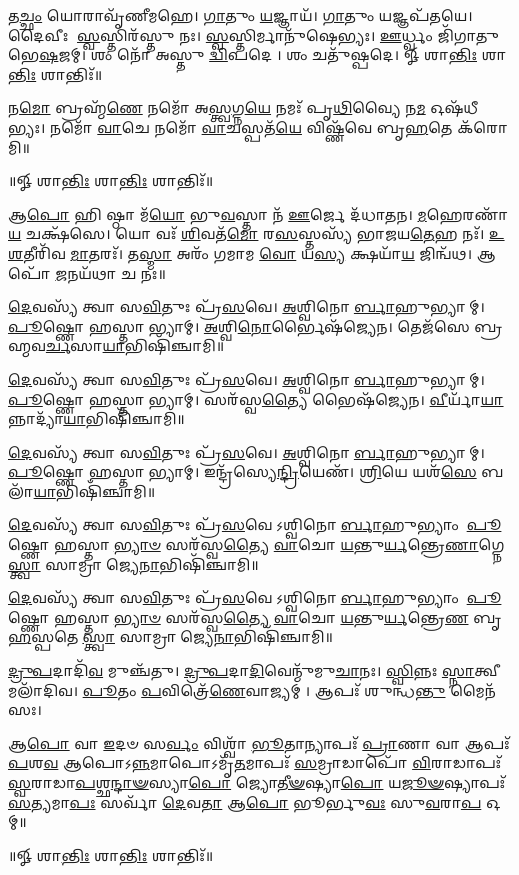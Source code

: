 𑌤\-\ul{𑌚𑍍𑌛𑌂} 𑌯𑍋𑌰𑌾𑌵𑍃᳴𑌣𑍀𑌮𑌹𑍇। \ul{𑌗𑌾}\-𑌤𑍁𑌂 \ul{𑌯}\-𑌜𑍍𑌞𑌾𑌯᳴।
\-\ul{𑌗𑌾}\-𑌤𑍁𑌂 𑌯𑌜𑍍𑌞𑌪᳴𑌤𑌯𑍇। 𑌦𑍈𑌵𑍀𑌃 \ul{𑌸𑍍𑌵}\-𑌸𑍍𑌤𑌿𑌰᳴𑌸𑍍𑌤𑍁 𑌨𑌃।
\-\ul{𑌸𑍍𑌵}\-𑌸𑍍𑌤𑌿𑌰𑍍𑌮𑌾𑌨𑍁᳴𑌷𑍇𑌭𑍍𑌯𑌃। \ul{𑌊}\-𑌰𑍍𑌧𑍍𑌵𑌂 𑌜𑌿᳴𑌗𑌾𑌤𑍁 𑌭𑍇\-\ul{𑌷}\-𑌜𑌮𑍍।
𑌶𑌂 𑌨𑍋᳴ 𑌅𑌸𑍍𑌤𑍁 \ul{𑌦𑍍𑌵𑌿}\-𑌪𑌦𑍇। 𑌶𑌂 𑌚𑌤𑍁᳴𑌷𑍍𑌪𑌦𑍇।
𑍐 𑌶𑌾\-\ul{𑌨𑍍𑌤𑌿𑌃} 𑌶𑌾\-\ul{𑌨𑍍𑌤𑌿𑌃} 𑌶𑌾𑌨𑍍𑌤𑌿𑌃᳴॥

𑌨\-\ul{𑌮𑍋} 𑌬𑍍𑌰𑌹𑍍𑌮᳴\-\ul{𑌣𑍇} 𑌨𑌮𑍋᳴ 𑌅\-\ul{𑌸𑍍𑌤𑍍𑌵}\-𑌗𑍍𑌨\-\ul{𑌯𑍇} 𑌨𑌮𑌃᳴ 𑌪𑍃\-\ul{𑌥𑌿}\-𑌵𑍍𑌯𑍈 𑌨\-\ul{𑌮} 𑌓𑌷᳴𑌧𑍀𑌭𑍍𑌯𑌃।
𑌨𑌮𑍋᳴ \ul{𑌵𑌾}\-𑌚𑍇 𑌨𑌮𑍋᳴ \ul{𑌵𑌾}\-𑌚𑌸𑍍𑌪𑌤᳴\-\ul{𑌯𑍇} 𑌵𑌿𑌷𑍍𑌣᳴𑌵𑍇 𑌬𑍃\-\ul{𑌹}\-𑌤𑍇 𑌕᳴𑌰𑍋𑌮𑌿॥

\centerline{॥𑍐 𑌶𑌾\-\ul{𑌨𑍍𑌤𑌿𑌃} 𑌶𑌾\-\ul{𑌨𑍍𑌤𑌿𑌃} 𑌶𑌾𑌨𑍍𑌤𑌿𑌃᳴॥}


𑌆\-\ul{𑌪𑍋} 𑌹𑌿 𑌷𑍍𑌠𑌾 𑌮᳴\-\ul{𑌯𑍋} 𑌭𑍁\-\ul{𑌵}\-𑌸𑍍𑌤𑌾 𑌨᳴ \ul{𑌊}\-𑌰𑍍𑌜𑍇 𑌦᳴𑌧𑌾𑌤𑌨।
\-\ul{𑌮}\-𑌹𑍇𑌰𑌣𑌾᳴\-\ul{𑌯} 𑌚𑌕𑍍𑌷᳴𑌸𑍇। 𑌯𑍋 𑌵𑌃᳴ \ul{𑌶𑌿}\-𑌵𑌤᳴\-\ul{𑌮𑍋} 𑌰\-\ul{𑌸}\-𑌸𑍍𑌤𑌸𑍍𑌯᳴ 𑌭𑌾𑌜𑌯\-\ul{𑌤𑍇}\-𑌹 𑌨𑌃᳴।
\-\ul{𑌉}\-\-\ul{𑌶}\-𑌤𑍀𑌰𑌿᳴𑌵 \ul{𑌮𑌾}\-𑌤𑌰𑌃᳴। 𑌤\-\ul{𑌸𑍍𑌮𑌾} 𑌅𑌰𑌂᳴ 𑌗𑌮𑌾𑌮 \ul{𑌵𑍋} 𑌯\-\ul{𑌸𑍍𑌯} 𑌕𑍍𑌷𑌯𑌾᳴\-\ul{𑌯} 𑌜𑌿𑌨𑍍𑌵᳴𑌥।
𑌆𑌪𑍋᳴ \ul{𑌜}\-𑌨𑌯᳴𑌥𑌾 𑌚 𑌨𑌃॥

\-\ul{𑌦𑍇}\-𑌵𑌸𑍍𑌯᳴ 𑌤𑍍𑌵𑌾 𑌸\-\ul{𑌵𑌿}\-𑌤𑍁𑌃 𑌪𑍍𑌰᳴\-\ul{𑌸}\-𑌵𑍇। \ul{𑌅}\-𑌶𑍍𑌵𑌿𑌨𑍋\-\ul{𑌰𑍍𑌬𑌾}\-𑌹𑍁𑌭𑍍𑌯𑌾𑌮𑍍। \ul{𑌪𑍂}\-𑌷𑍍𑌣𑍋 𑌹𑌸𑍍𑌤𑌾𑌭𑍍𑌯𑌾𑌮𑍍।
\-\ul{𑌅}\-𑌶𑍍𑌵𑌿\-\ul{𑌨𑍋}\-𑌰𑍍𑌭𑍈𑌷᳴𑌜𑍍𑌯𑍇𑌨। 𑌤𑍇𑌜᳴𑌸𑍇 𑌬𑍍𑌰𑌹𑍍𑌮𑌵\-\ul{𑌰𑍍𑌚}\-𑌸𑌾\-\ul{𑌯𑌾}\-𑌭𑌿𑌷𑌿᳴𑌞𑍍𑌚𑌾𑌮𑌿॥

\-\ul{𑌦𑍇}\-𑌵𑌸𑍍𑌯᳴ 𑌤𑍍𑌵𑌾 𑌸\-\ul{𑌵𑌿}\-𑌤𑍁𑌃 𑌪𑍍𑌰᳴\-\ul{𑌸}\-𑌵𑍇। \ul{𑌅}\-𑌶𑍍𑌵𑌿𑌨𑍋\-\ul{𑌰𑍍𑌬𑌾}\-𑌹𑍁𑌭𑍍𑌯𑌾𑌮𑍍। \ul{𑌪𑍂}\-𑌷𑍍𑌣𑍋 𑌹𑌸𑍍𑌤𑌾𑌭𑍍𑌯𑌾𑌮𑍍।
𑌸𑌰᳴𑌸𑍍𑌵\-\ul{𑌤𑍍𑌯𑍈} 𑌭𑍈𑌷᳴𑌜𑍍𑌯𑍇𑌨। \ul{𑌵𑍀}\-𑌰𑍍𑌯𑌾᳴\-\ul{𑌯𑌾}\-𑌨𑍍𑌨𑌾𑌦𑍍𑌯𑌾᳴\-\ul{𑌯𑌾}\-𑌭𑌿𑌷𑌿᳴𑌞𑍍𑌚𑌾𑌮𑌿॥

\-\ul{𑌦𑍇}\-𑌵𑌸𑍍𑌯᳴ 𑌤𑍍𑌵𑌾 𑌸\-\ul{𑌵𑌿}\-𑌤𑍁𑌃 𑌪𑍍𑌰᳴\-\ul{𑌸}\-𑌵𑍇। \ul{𑌅}\-𑌶𑍍𑌵𑌿𑌨𑍋\-\ul{𑌰𑍍𑌬𑌾}\-𑌹𑍁𑌭𑍍𑌯𑌾𑌮𑍍। \ul{𑌪𑍂}\-𑌷𑍍𑌣𑍋 𑌹𑌸𑍍𑌤𑌾𑌭𑍍𑌯𑌾𑌮𑍍।
𑌇𑌨𑍍𑌦𑍍𑌰᳴𑌸𑍍𑌯𑍇\-\ul{𑌨𑍍𑌦𑍍𑌰𑌿}\-𑌯𑍇𑌣᳴। \ul{𑌶𑍍𑌰𑌿}\-𑌯𑍇 𑌯𑌶᳴\-\ul{𑌸𑍇} 𑌬𑌲𑌾᳴\-\ul{𑌯𑌾}\-𑌭𑌿𑌷𑌿᳴𑌞𑍍𑌚𑌾𑌮𑌿॥

\-\ul{𑌦𑍇}\-𑌵𑌸𑍍𑌯᳴ 𑌤𑍍𑌵𑌾 𑌸\-\ul{𑌵𑌿}\-𑌤𑍁𑌃 𑌪𑍍𑌰᳴\-\ul{𑌸}\-𑌵𑍇𑌽𑌶𑍍𑌵𑌿𑌨𑍋\-\ul{𑌰𑍍𑌬𑌾}\-𑌹𑍁𑌭𑍍𑌯𑌾𑌂 \ul{𑌪𑍂}\-𑌷𑍍𑌣𑍋 𑌹𑌸𑍍𑌤𑌾\-\ul{𑌭𑍍𑌯𑌾}\-\-\ul{𑍞}\-
𑌸𑌰᳴𑌸𑍍𑌵\-\ul{𑌤𑍍𑌯𑍈} \ul{𑌵𑌾}\-𑌚𑍋 \ul{𑌯}\-𑌨𑍍𑌤𑍁\-\ul{𑌰𑍍𑌯}\-𑌨𑍍𑌤𑍍𑌰𑍇\-\ul{𑌣𑌾}\-𑌗𑍍𑌨𑍇\-\ul{𑌸𑍍𑌤𑍍𑌵𑌾} 𑌸𑌾𑌮𑍍𑌰𑌾𑌜𑍍𑌯𑍇\-\ul{𑌨𑌾}\-𑌭𑌿𑌷𑌿᳴𑌞𑍍𑌚𑌾𑌮𑌿॥

\-\ul{𑌦𑍇}\-𑌵𑌸𑍍𑌯᳴ 𑌤𑍍𑌵𑌾 𑌸\-\ul{𑌵𑌿}\-𑌤𑍁𑌃 𑌪𑍍𑌰᳴\-\ul{𑌸}\-𑌵𑍇𑌽𑌶𑍍𑌵𑌿𑌨𑍋\-\ul{𑌰𑍍𑌬𑌾}\-𑌹𑍁𑌭𑍍𑌯𑌾𑌂 \ul{𑌪𑍂}\-𑌷𑍍𑌣𑍋 𑌹𑌸𑍍𑌤𑌾\-\ul{𑌭𑍍𑌯𑌾}\-\-\ul{𑍞}\-
𑌸𑌰᳴𑌸𑍍𑌵\-\ul{𑌤𑍍𑌯𑍈} \ul{𑌵𑌾}\-𑌚𑍋 \ul{𑌯}\-𑌨𑍍𑌤𑍁\-\ul{𑌰𑍍𑌯}\-𑌨𑍍𑌤𑍍𑌰𑍇\-\ul{𑌣} 𑌬𑍃\-\ul{𑌹}\-𑌸𑍍𑌪𑌤𑍇\-\ul{𑌸𑍍𑌤𑍍𑌵𑌾} 𑌸𑌾𑌮𑍍𑌰𑌾𑌜𑍍𑌯𑍇\-\ul{𑌨𑌾}\-𑌭𑌿𑌷𑌿᳴𑌞𑍍𑌚𑌾𑌮𑌿॥

\-\ul{𑌦𑍍𑌰𑍁}\-\-\ul{𑌪}\-𑌦𑌾𑌦𑌿᳴\-\ul{𑌵} 𑌮𑍁𑌞𑍍𑌚᳴𑌤𑍁। \ul{𑌦𑍍𑌰𑍁}\-\-\ul{𑌪}\-𑌦𑌾\-\ul{𑌦𑌿}\-𑌵𑍇𑌨𑍍𑌮𑍁᳴𑌮𑍁\-\ul{𑌚𑌾}\-𑌨𑌃।
\-\ul{𑌸𑍍𑌵𑌿}\-𑌨𑍍𑌨𑌃 \ul{𑌸𑍍𑌨𑌾}\-𑌤𑍍𑌵𑍀 𑌮𑌲𑌾᳴𑌦𑌿𑌵। \ul{𑌪𑍂}\-𑌤𑌂 \ul{𑌪}\-𑌵𑌿𑌤𑍍𑌰𑍇᳴\-\ul{𑌣𑍇}\-𑌵𑌾𑌜𑍍𑌯𑌮𑍍।
𑌆𑌪𑌃᳴ 𑌶𑍁𑌨𑍍𑌧\-\ul{𑌨𑍍𑌤𑍁} 𑌮𑍈𑌨᳴𑌸𑌃।

𑌆\-\ul{𑌪𑍋} 𑌵𑌾 \ul{𑌇}\-𑌦𑍞 𑌸\-\ul{𑌰𑍍𑌵𑌂} 𑌵𑌿𑌶𑍍𑌵𑌾᳴ \ul{𑌭𑍂}\-𑌤𑌾𑌨𑍍𑌯𑌾𑌪𑌃᳴ \ul{𑌪𑍍𑌰𑌾}\-𑌣𑌾 𑌵𑌾 𑌆𑌪𑌃᳴ \ul{𑌪}\-𑌶\-\ul{𑌵} 𑌆𑌪𑍋𑌽\-\ul{𑌨𑍍𑌨}\-𑌮𑌾𑌪𑍋𑌽𑌮𑍃᳴\-\ul{𑌤}\-𑌮𑌾𑌪𑌃᳴ \ul{𑌸}\-𑌮𑍍𑌰𑌾𑌡𑌾𑌪𑍋᳴ \ul{𑌵𑌿}\-𑌰𑌾𑌡𑌾𑌪𑌃᳴ \ul{𑌸𑍍𑌵}\-𑌰𑌾𑌡𑌾\-\ul{𑌪}\-𑌶𑍍𑌛\-\ul{𑌨𑍍𑌦𑌾}\-\-\ul{𑍟}\-𑌸𑍍𑌯𑌾\-\ul{𑌪𑍋} 𑌜𑍍𑌯𑍋\-\ul{𑌤𑍀}\-\-\ul{𑍟}\-𑌷𑍍𑌯𑌾\-\ul{𑌪𑍋} 𑌯\-\ul{𑌜𑍂}\-\-\ul{𑍟}\-𑌷𑍍𑌯𑌾𑌪𑌃᳴ \ul{𑌸}\-𑌤𑍍𑌯𑌮𑌾\-\ul{𑌪𑌃} 𑌸𑌰𑍍𑌵𑌾᳴ \ul{𑌦𑍇}\-𑌵\-\ul{𑌤𑌾} 𑌆\-\ul{𑌪𑍋} 𑌭𑍂𑌰𑍍𑌭𑍁\-\ul{𑌵𑌃} 𑌸𑍁\-\ul{𑌵}\-𑌰𑌾\-\ul{𑌪} 𑌓𑌮𑍍॥

\centerline{॥𑍐 𑌶𑌾\-\ul{𑌨𑍍𑌤𑌿𑌃} 𑌶𑌾\-\ul{𑌨𑍍𑌤𑌿𑌃} 𑌶𑌾𑌨𑍍𑌤𑌿𑌃᳴॥}
